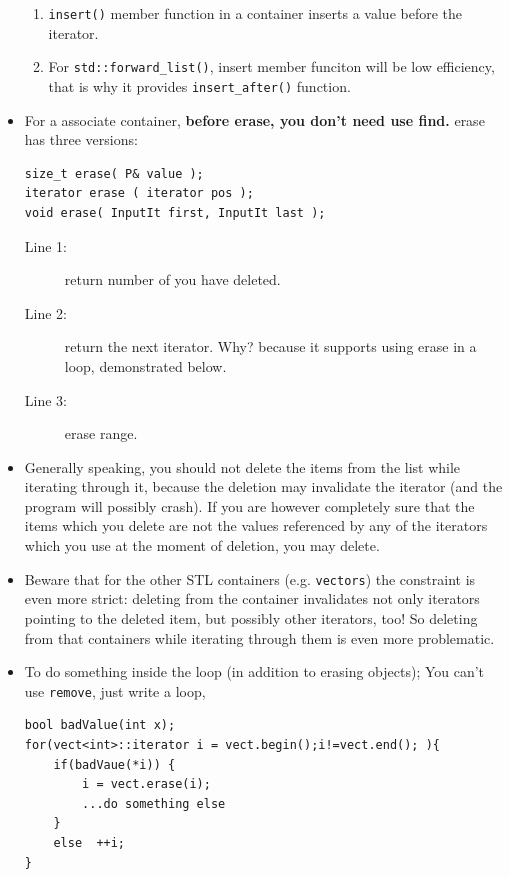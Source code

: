 \documentclass[a4paper,11pt,twoside]{book}
\begin{document}
\begin{itemize}
\begin{enumerate}
	\item \texttt{insert()} member function in a container inserts a value before the iterator. 
	
	\item For \texttt{std::forward\_list()}, insert member funciton will be low efficiency, that is why it provides \texttt{insert\_after()} function.
\end{enumerate}


\item For a associate container, \textbf{before erase, you don't need use find.} erase has three versions:
\begin{lstlisting}[numbers=none]
size_t erase( P& value ); 
iterator erase ( iterator pos );
void erase( InputIt first, InputIt last );
\end{lstlisting}
\begin{description}
	\item[Line 1:] return number of you have deleted.
	\item[Line 2:] return the next iterator. Why? because it supports using erase in a loop, demonstrated below.
	\item[Line 3:] erase range.
\end{description}




\item Generally speaking, you should not delete the items from the list while iterating through it, because the deletion may invalidate the iterator (and the program will possibly crash). If you are however completely sure that the items which you delete are not the values referenced by any of the iterators which you use at the moment of deletion, you may delete.

\item Beware that for the other STL containers (e.g. \texttt{vectors}) the constraint is even more strict: deleting from the container invalidates not only iterators pointing to the deleted item, but possibly other iterators, too! So deleting from that containers while iterating through them is even more problematic.

\item To do something inside the loop (in addition to erasing objects);  You can't use \texttt{remove}, just write a loop,
\begin{lstlisting}[numbers=none]
bool badValue(int x);
for(vect<int>::iterator i = vect.begin();i!=vect.end(); ){
	if(badVaue(*i)) {
		i = vect.erase(i);
		...do something else
	}
	else  ++i;
}	
\end{lstlisting}


\end{itemize}
\end{document}
